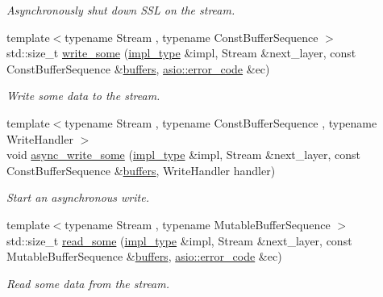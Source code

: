 \begin{DoxyCompactItemize}
\begin{DoxyCompactList}\small\item\em Asynchronously shut down S\+S\+L on the stream. \end{DoxyCompactList}\item 
{\footnotesize template$<$typename Stream , typename Const\+Buffer\+Sequence $>$ }\\std\+::size\+\_\+t \hyperlink{classasio_1_1ssl_1_1old_1_1stream__service_ac6fb9862272bdbcc0c66197a1afc72d9}{write\+\_\+some} (\hyperlink{classasio_1_1ssl_1_1old_1_1stream__service_a7e2131ccd16fbc04d0f86c61288e4175}{impl\+\_\+type} \&impl, Stream \&next\+\_\+layer, const Const\+Buffer\+Sequence \&\hyperlink{group__async__read_ga54dede45c3175148a77fe6635222c47d}{buffers}, \hyperlink{classasio_1_1error__code}{asio\+::error\+\_\+code} \&ec)
\begin{DoxyCompactList}\small\item\em Write some data to the stream. \end{DoxyCompactList}\item 
{\footnotesize template$<$typename Stream , typename Const\+Buffer\+Sequence , typename Write\+Handler $>$ }\\void \hyperlink{classasio_1_1ssl_1_1old_1_1stream__service_ae4eb9bc4f5dae235790810b15ad90ecd}{async\+\_\+write\+\_\+some} (\hyperlink{classasio_1_1ssl_1_1old_1_1stream__service_a7e2131ccd16fbc04d0f86c61288e4175}{impl\+\_\+type} \&impl, Stream \&next\+\_\+layer, const Const\+Buffer\+Sequence \&\hyperlink{group__async__read_ga54dede45c3175148a77fe6635222c47d}{buffers}, Write\+Handler handler)
\begin{DoxyCompactList}\small\item\em Start an asynchronous write. \end{DoxyCompactList}\item 
{\footnotesize template$<$typename Stream , typename Mutable\+Buffer\+Sequence $>$ }\\std\+::size\+\_\+t \hyperlink{classasio_1_1ssl_1_1old_1_1stream__service_a5604dd55b5834ad167b81cd1f98fd5aa}{read\+\_\+some} (\hyperlink{classasio_1_1ssl_1_1old_1_1stream__service_a7e2131ccd16fbc04d0f86c61288e4175}{impl\+\_\+type} \&impl, Stream \&next\+\_\+layer, const Mutable\+Buffer\+Sequence \&\hyperlink{group__async__read_ga54dede45c3175148a77fe6635222c47d}{buffers}, \hyperlink{classasio_1_1error__code}{asio\+::error\+\_\+code} \&ec)
\begin{DoxyCompactList}\small\item\em Read some data from the stream. \end{DoxyCompactList}\item 

\end{DoxyCompactItemize}
